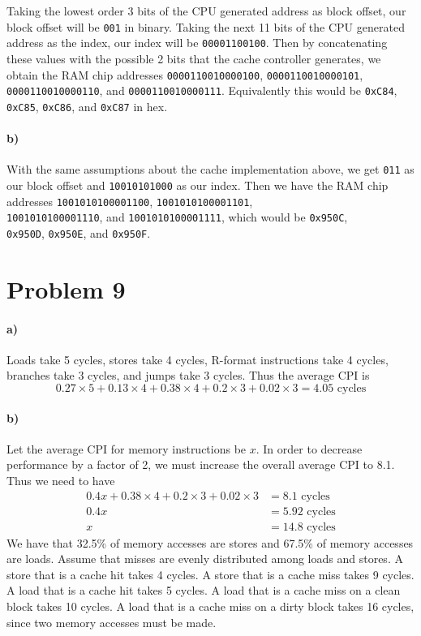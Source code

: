 \documentclass[12pt]{article}
\begin{document}
Taking the lowest order 3 bits of the CPU generated address as block offset, our block offset will be \texttt{001} in binary. Taking the next 11 bits
of the CPU generated address as the index, our index will be \texttt{00001100100}. Then by concatenating these values with the possible 2 bits that the cache
controller generates, we obtain the RAM chip addresses \texttt{0000110010000100}, \texttt{0000110010000101}, \texttt{0000110010000110},
and \texttt{0000110010000111}. Equivalently this would be \texttt{0xC84}, \texttt{0xC85}, \texttt{0xC86}, and \texttt{0xC87} in hex.

\paragraph{b)}

With the same assumptions about the cache implementation above, we get \texttt{011} as our block offset and \texttt{10010101000} as our index.
Then we have the RAM chip addresses \texttt{1001010100001100}, \texttt{1001010100001101},\\
\texttt{1001010100001110}, and \texttt{1001010100001111}, which would be \texttt{0x950C},\\
\texttt{0x950D}, \texttt{0x950E}, and \texttt{0x950F}.

\section*{Problem 9}

\paragraph{a)}

Loads take 5 cycles, stores take 4 cycles, R-format instructions take 4 cycles, branches take 3 cycles, and jumps take 3 cycles.
Thus the average CPI is
\[0.27\times 5+0.13\times 4+0.38\times 4+0.2\times 3+ 0.02\times 3 = 4.05 \text{ cycles}\]

\paragraph{b)}

Let the average CPI for memory instructions be \(x\). In order to decrease performance by a factor of 2, we must increase the overall average CPI to
8.1. Thus we need to have
\begin{align*}
        0.4x + 0.38\times 4+0.2\times 3+0.02\times 3 &= 8.1 \text{ cycles}\\
        0.4x&= 5.92 \text{ cycles}\\
        x&= 14.8 \text{ cycles}
\end{align*}
We have that 32.5\% of memory accesses are stores and 67.5\% of memory accesses are loads. Assume that misses are evenly distributed among loads and stores.
A store that is a cache hit takes 4 cycles. A store that is a cache miss takes 9 cycles. A load that is a cache hit takes 5 cycles. A load that is a cache
miss on a clean block takes 10 cycles. A load that is a cache miss on a dirty block takes 16 cycles, since two memory accesses must be made.
\end{document}
